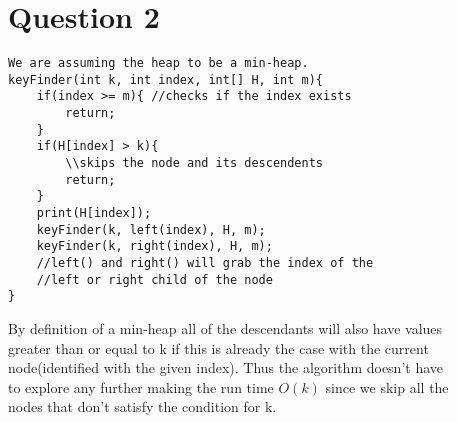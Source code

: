 \documentclass{article}
\begin{document}
\section{Question 2}
\begin{lstlisting}
We are assuming the heap to be a min-heap.
keyFinder(int k, int index, int[] H, int m){
    if(index >= m){ //checks if the index exists
        return;
    }
    if(H[index] > k){
        \\skips the node and its descendents
        return; 
    }
    print(H[index]);
    keyFinder(k, left(index), H, m);
    keyFinder(k, right(index), H, m);
    //left() and right() will grab the index of the
    //left or right child of the node
}
\end{lstlisting}
By definition of a min-heap all of the descendants will also have values
\\greater than or equal to k if this is already the case with the current
\\node(identified with the given index). Thus the algorithm doesn't have 
\\to explore any further making the run time $O(k)$ since we skip all the
\\nodes that don't satisfy the condition for k.


~\\
\end{document}
